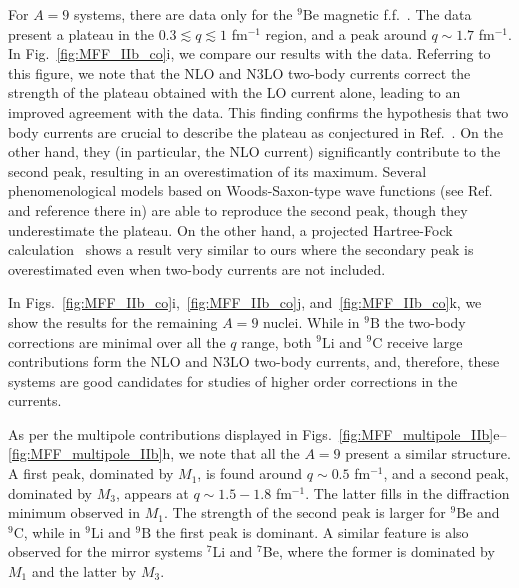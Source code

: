\documentclass[aps,prc,floatfix,showpacs,twocolumn, preprintnumbers]{revtex4-2}
\newcommand{\linin}{{}^9\text{Li}}
\newcommand{\cnin}{{}^9\text{C}}
\newcommand{\benin}{{}^9\text{Be}}
\newcommand{\bnin}{{}^9\text{B}}
\begin{document}
For $A=9$ systems, there are data only for the $\benin$ magnetic f.f.~\cite{Goldemberg1963,Lapikas1975,Rand1966,Vanpraet1965}. The data present a plateau in the $0.3\lesssim q \lesssim 1$ fm$^{-1}$ region, and a peak around $q\sim 1.7$ fm$^{-1}$. In Fig.~\ref{fig:MFF_IIb_co}i, we compare our results with the data. Referring to this figure, we note that the NLO and N3LO two-body currents correct the strength of the plateau obtained with the LO current alone, leading to an improved agreement with the data. This finding confirms the hypothesis that two body currents are crucial to describe the plateau as conjectured in Ref.~\cite{Donnelly1984}. On the other hand, they (in particular, the NLO current) significantly contribute to the second peak, resulting in an overestimation of its maximum. Several phenomenological models  based on Woods-Saxon-type wave functions (see Ref.~\cite{Donnelly1984} and reference there in) are able to reproduce the second peak, though they underestimate the plateau. On the other hand, a projected Hartree-Fock calculation~\cite{Bouten:1969xmx} shows a result very similar to ours where the secondary peak is overestimated even when two-body currents are not included.

In Figs.~\ref{fig:MFF_IIb_co}i,~\ref{fig:MFF_IIb_co}j, and~\ref{fig:MFF_IIb_co}k, we show the results for the remaining $A=9$ nuclei.  While in $\bnin$ the two-body corrections are minimal over all the $q$ range, both $\linin$ and $\cnin$ receive large contributions form the NLO and N3LO two-body currents, and, therefore, these systems are good candidates for studies of higher order corrections in the currents. 

As per the multipole contributions displayed in Figs.~\ref{fig:MFF_multipole_IIb}e--\ref{fig:MFF_multipole_IIb}h, we note that all the $A=9$ present a similar structure. A first peak,  dominated by $M_1$, is found around $q\sim0.5$ fm$^{-1}$, and a second peak, dominated by $M_3$, appears at $q\sim1.5-1.8$ fm$^{-1}$. The latter fills in the diffraction minimum observed in $M_1$. The strength of the second peak is larger for $\benin$ and $\cnin$, while in $\linin$ and $\bnin$ the first peak is dominant. A similar feature is also observed for the mirror systems $^7$Li and $^7$Be, where the former is dominated by $M_1$ and the latter by $M_3$.
\end{document}
